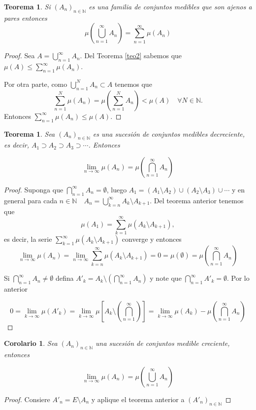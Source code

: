 \documentclass[twoside,12pt,a4 paper,openright]{book}
\newtheorem{teo}[claim]{Teorema}
\newtheorem{cor}[claim]{Corolario}
\begin{document}
\begin{teo}
    Si $(A_n)_{n \in \mathbb{N}}$ es una familia de conjuntos medibles que son ajenos a pares  entonces 
    $$\mu\left(\bigcup_{n=1}^{\infty}A_n\right) = \sum_{n=1}^{\infty}\mu(A_n)$$
\end{teo}
\begin{proof}
    Sea $A = \bigcup_{n=1}^{\infty}A_n$. Del Teorema \ref{teo2}
 sabemos que 
$\displaystyle  \mu(A) \leq \sum_{n=1}^{\infty}\mu(A_n)$.  

Por otra parte, como  $\bigcup_{n= 1}^{N}A_n \subset A$ tenemos que 
    $$\sum_{n=1}^{N}\mu(A_n) = \mu \left(\sum_{n=1}^{N}A_n\right) < \mu(A) \quad \forall N\in \mathbb{N}.$$
Entonces $ \displaystyle  \sum_{n=1}^{\infty}\mu(A_n)\leq \mu(A)$.
\end{proof}

\begin{teo} \label{teo235}
   Sea $(A_n)_{n\in \mathbb{N}}$ es una sucesi\'on de conjuntos medibles decreciente, es decir, $A_1\supset A_2\supset A_3\supset\cdots$. Entonces

    $$\lim_{n\to \infty}\mu(A_n)  = \mu\left(\bigcap_{n=1}^{\infty} A_n\right)$$ 
\end{teo}
\begin{proof}
    Suponga que $\bigcap_{n=1}^{\infty}A_n = \emptyset$, luego $A_1 = (A_1\setminus A_2)\cup(A_2\setminus A_3)\cup \cdots$ y en general para cada $n\in \mathbb{N}\quad A_n = \bigcup_{k= n}^{\infty}A_k\setminus A_{k + 1}$. Del teorema anterior tenemos que 
    $$\mu(A_1) = \sum_{k=1}^{\infty}\mu(A_k\setminus A_{k + 1}),$$
es decir, la serie $\sum_{k=1}^{\infty}\mu(A_k\setminus A_{k + 1})$ converge y entonces 
    $$\lim_{n\to \infty}\mu(A_n) = \lim_{n\to \infty}\sum_{k=n}^{\infty}\mu(A_k\setminus A_{k + 1}) = 0 = \mu(\emptyset) = \mu \left(\bigcap_{n=1}^{\infty} A_n\right)$$

    Si $\bigcap_{n=1}^{\infty}A_n \neq \emptyset$ defina $A'_k = A_k \setminus\left(\bigcap_{n=1}^{\infty}A_n\right)$ y note que $\bigcap_{n=1}^{\infty} A'_k = \emptyset$. Por lo anterior 

    $$0 = \lim_{k\to \infty} \mu(A'_k) = \lim_{k\to \infty}\mu\left[A_k\setminus\left(\bigcap_{n=1}^{\infty}\right)\right] = \lim_{k\to \infty}\mu(A_k) - \mu\left(\bigcap_{n=1}^{\infty}A_n\right)$$
\end{proof}



\begin{cor}
    Sea $(A_n)_{n\in \mathbb{N}}$ una sucesi\'on de conjuntos medible creciente, entonces

    $$\lim_{n\to \infty}\mu(A_n) = \mu \left(\bigcup_{n=1}^{\infty}A_n\right)$$
\end{cor}
\begin{proof}
    Consiere $A'_n = E\setminus A_n$ y aplique el teorema anterior a $(A'_n)_{n\in \mathbb{N}}$
\end{proof}
\end{document}
